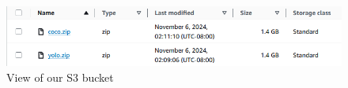 \documentclass[stu,12pt,floatsintext]{apa7}
\begin{document}
\begin{figure}[!htb]
	\centering
	\includegraphics[width=0.75\linewidth]{images/s3_bucket.png}
	\caption{View of our S3 bucket}
	\label{fig:s3}
\end{figure}

\printbibliography

\end{document}
